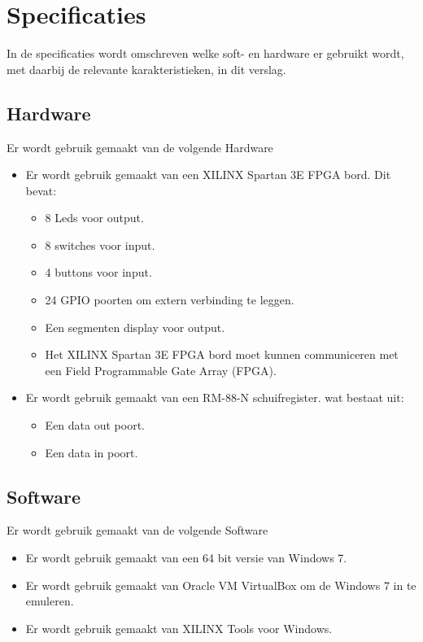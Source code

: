 \chapter{Specificaties}

In de specificaties wordt omschreven welke soft- en hardware er gebruikt wordt, met daarbij de relevante karakteristieken, in dit verslag.


\section{Hardware}
Er wordt gebruik gemaakt van de volgende Hardware

\begin{itemize}
	\item Er wordt gebruik gemaakt van een XILINX Spartan 3E FPGA bord. Dit bevat: 
	\begin{itemize}
		\item 8 Leds voor output.
		\item 8 switches voor input.
		\item 4 buttons voor input.
		\item 24 GPIO poorten om extern verbinding te leggen.
		\item Een segmenten display voor output.
		\item Het XILINX Spartan 3E FPGA bord moet kunnen communiceren met een Field Programmable Gate Array (FPGA).
	\end{itemize}
	\item Er wordt gebruik gemaakt van een RM-88-N schuifregister. wat bestaat uit: 
	\begin{itemize}
		\item Een data out poort.
		\item Een data in poort.
	\end{itemize}
\end{itemize}

\section{Software}
 Er wordt gebruik gemaakt van de volgende Software
\begin{itemize}
	\item Er wordt gebruik gemaakt van een 64 bit versie van Windows 7.
	\item Er wordt gebruik gemaakt van Oracle VM VirtualBox om de Windows 7 in te emuleren.
	\item Er wordt gebruik gemaakt van XILINX Tools voor Windows.
\end{itemize}